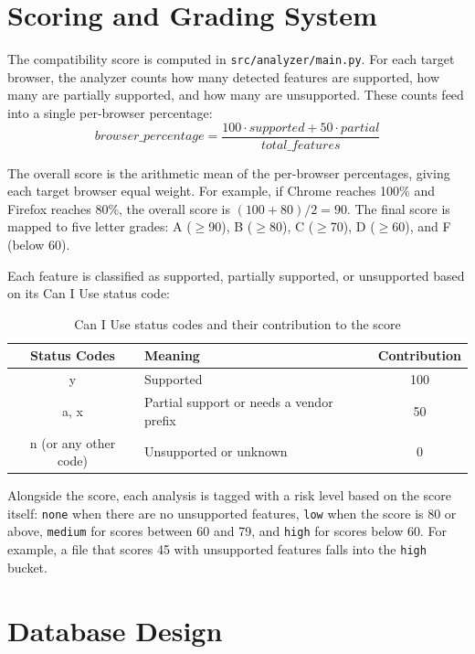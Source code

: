 \section{Scoring and Grading System}
\label{sec:scoring}

The compatibility score is computed in \texttt{src/analyzer/main.py}. For each target browser, the analyzer counts how many detected features are supported, how many are partially supported, and how many are unsupported. These counts feed into a single per-browser percentage:
\[
\mathit{browser\_percentage} = \frac{100 \cdot \mathit{supported} + 50 \cdot \mathit{partial}}{\mathit{total\_features}}
\]

The overall score is the arithmetic mean of the per-browser percentages, giving each target browser equal weight. For example, if Chrome reaches 100\% and Firefox reaches 80\%, the overall score is $(100 + 80) / 2 = 90$. The final score is mapped to five letter grades: A ($\geq$90), B ($\geq$80), C ($\geq$70), D ($\geq$60), and F (below 60).


Each feature is classified as supported, partially supported, or unsupported based on its Can I Use status code:

\begin{table}[H]
    \centering
    \begin{tabular}{|c|l|c|}
        \hline
        \textbf{Status Codes} & \textbf{Meaning} & \textbf{Contribution} \\
        \hline \hline
        y & Supported & 100 \\
        \hline
        a, x & Partial support or needs a vendor prefix & 50 \\
        \hline
        n (or any other code) & Unsupported or unknown & 0 \\
        \hline
    \end{tabular}
    \caption{Can I Use status codes and their contribution to the score}
    \label{tab:status-scores}
\end{table}

Alongside the score, each analysis is tagged with a risk level based on the score itself: \texttt{none} when there are no unsupported features, \texttt{low} when the score is 80 or above, \texttt{medium} for scores between 60 and 79, and \texttt{high} for scores below 60. For example, a file that scores 45 with unsupported features falls into the \texttt{high} bucket.

\section{Database Design}
\label{sec:database}

